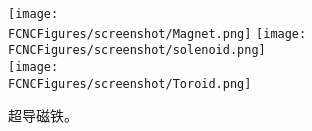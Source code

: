 \begin{figure}[H]
\centering
\texttt{[image: \\FCNCFigures/screenshot/Magnet.png]}
\texttt{[image: \\FCNCFigures/screenshot/solenoid.png]}\\
\texttt{[image: \\FCNCFigures/screenshot/Toroid.png]}
\caption{超导磁铁。}
\label{fig:Magnet}
\end{figure}